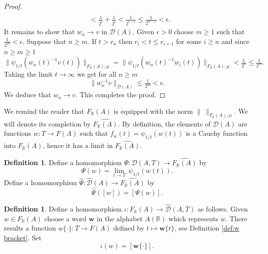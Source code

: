 \documentclass[12pt]{amsart}
\theoremstyle{definition}
\newtheorem{defn}[prop]{Definition}
\def\RR{\ensuremath{\mathbb{R}}}
\newcommand{\B}[1]{\mathbf{#1}}
\newcommand{\C}[1]{\mathcal{#1}}
\newcommand{\trc}[1]{\{ #1 \}}   %
\def\Free{F}
\def\D{\mathcal{D}}
\def\tD{\hat{\D}}
\begin{document}
\begin{proof}
\begin{align*}
\\
& <
\tfrac{1}{2^i} + \tfrac{1}{2^i}  < \tfrac{1}{2^{i-1}} \leq \tfrac{1}{2^{n-1}} < \epsilon.
\end{align*}
It remains to show that $w_n \to v$ in $\C D(A)$.
Given $\epsilon>0$ choose $m \geq 1$ such that $\tfrac{1}{2^{m}}<\epsilon$.
Suppose that $n \geq m$.
If $t > r_n$ then $r_{i}<t \leq r_{i+1}$ for some $i \geq n$ and since $n \geq m \geq 1$
\[
\|\psi_{1/t}(w_n(t)^{-1} v(t))\|_{\Free_\RR(A);\mu} =
\|\psi_{1/t}(w_n(t)^{-1} w_i(t))\|_{\Free_\RR(A);\mu} < \tfrac{1}{2^n} \leq \tfrac{1}{2^{m}}.
\]
Taking the limit $t \to \infty$ we get for all $n \geq m$
\[
\| w_n^{-1} v\|_{\C D(A)} \leq \tfrac{1}{2^m}<\epsilon.
\]
We deduce that $w_n \to v$.
This completes the proof.
\end{proof}

We remind the reader that $\Free_\RR(A)$ is equipped with the norm $\| \ \|_{\Free_\RR(A);\mu}$.
We will denote its completion by $\widehat{\Free_\RR(A)}$.
By definition, the elements of  $\C D(A)$ are functions $w \colon T \to \Free(A)$ such that $f_w(t)=\psi_{1/t}(w(t))$ is a Cauchy function into $\Free_\RR(A)$, hence it has a limit in $\widehat{\Free_\RR(A)}$.




\begin{defn}\label{D:Psi D(A)-->FR(A)}
Define a homomorphism $\Psi \colon \C D(A,T) \to \widehat{\Free_\RR(A)}$ by 
\[
\Psi(w) = \lim_{t \to T}\, \psi_{1/t}(w(t)). 
\]
Define a homomorphism $\hat{\Psi} \colon \tD(A) \to \widehat{\Free_\RR(A)}$ by 
\[
\hat{\Psi}([w]) = [\Psi(w)]. %
\]
\end{defn}



\begin{defn}\label{D:iota FR(A)-->tD(A)}
Define a homomorphism $\iota \colon \Free_\RR(A) \to \tD(A,T)$ as follows.
Given $w \in \Free_\RR(A)$ choose a word $\B w$ in the alphabet $A(\RR)$ which represents $w$.
There results a function $w\trc{\cdot} \colon T \to \Free(A)$ defined by $t \mapsto \B w\trc{t}$, see Definition \ref{def:w bracket}. %
Set
\[
\iota(w) = [\B w\trc{\cdot}].
\]
\end{defn}
\end{document}
